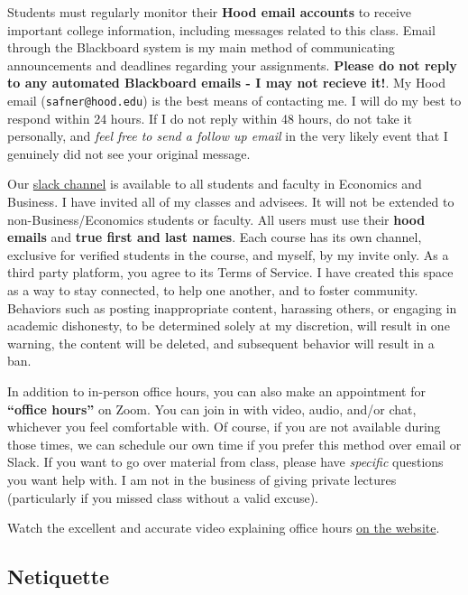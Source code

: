 \documentclass{article}
\begin{document}
Students must regularly monitor their \textbf{Hood email accounts} to
receive important college information, including messages related to
this class. Email through the Blackboard system is my main method of
communicating announcements and deadlines regarding your assignments.
\textbf{Please do not reply to any automated Blackboard emails - I may
not recieve it!}. My Hood email (\texttt{safner@hood.edu}) is the best
means of contacting me. I will do my best to respond within 24 hours. If
I do not reply within 48 hours, do not take it personally, and
\emph{feel free to send a follow up email} in the very likely event that
I genuinely did not see your original message.

Our \href{https://hoodcollegeeconomics.slack.com}{slack channel} is
available to all students and faculty in Economics and Business. I have
invited all of my classes and advisees. It will not be extended to
non-Business/Economics students or faculty. All users must use their
\textbf{hood emails} and \textbf{true first and last names}. Each course
has its own channel, exclusive for verified students in the course, and
myself, by my invite only. As a third party platform, you agree to its
Terms of Service. I have created this space as a way to stay connected,
to help one another, and to foster community. Behaviors such as posting
inappropriate content, harassing others, or engaging in academic
dishonesty, to be determined solely at my discretion, will result in one
warning, the content will be deleted, and subsequent behavior will
result in a ban.

In addition to in-person office hours, you can also make an appointment
for \textbf{``office hours''} on Zoom. You can join in with video,
audio, and/or chat, whichever you feel comfortable with. Of course, if
you are not available during those times, we can schedule our own time
if you prefer this method over email or Slack. If you want to go over
material from class, please have \emph{specific} questions you want help
with. I am not in the business of giving private lectures (particularly
if you missed class without a valid excuse).

Watch the excellent and accurate video explaining office hours
\href{https://gamef21.classes.ryansafner.com/syllabus/\#communication-email-slack-and-virtual-office-hours}{on
the website}.

\hypertarget{netiquette}{%
\subsection{Netiquette}\label{netiquette}}
\end{document}
